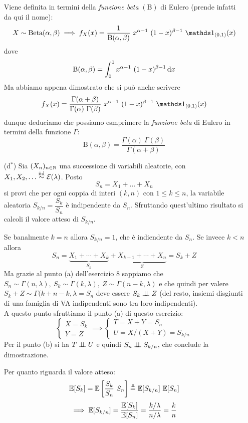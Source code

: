 \begin{enumerate}
\begin{oss}
Viene definita in termini della \emph{funzione beta} $(\mathrm{B})$ di Eulero (prende infatti da qui il nome):
\[
X\sim\text{Beta}(\alpha,\beta)\implies f_X(x)=\frac{1}{\mathrm{B}(\alpha,\beta)}\ x^{\alpha-1}\ (1-x)^{\beta-1}\ \Ind_{(0,1)}(x)
\]
dove
\[
\mathrm{B}(\alpha,\beta)=\int_0^1 x^{\alpha-1}\ (1-x)^{\beta-1}\dx
\]
Ma abbiamo appena dimostrato che si può anche scrivere
\[
f_X(x)=\frac{\Gamma(\alpha+\beta)}{\Gamma(\alpha)\ \Gamma(\beta)}\ x^{\alpha-1}\ (1-x)^{\beta-1}\ \Ind_{(0,1)}(x)
\]
dunque deduciamo che possiamo esmprimere la \emph{funzione beta} di Eulero in termini della funzione $\Gamma$:
\[
\mathrm{B}(\alpha,\beta)=\frac{\Gamma(\alpha)\ \Gamma(\beta)}{\Gamma(\alpha+\beta)}
\]
\end{oss}

\item [(d$^\ast$)] Sia $(X_n)_{n\in\mathbb{N}}$ una successione di variabili aleatorie, con $X_1,X_2,\dots\stackrel{\mathrm{iid}}{\sim}\mathcal{E}(\lambda)$. Posto
\[
S_n=X_1+\dots+X_n
\]
si provi che per ogni coppia di interi $(k,n)$ con $1\leq k\leq n$, la variabile aleatoria $S_{k/n}=\dfrac{S_k}{S_n}$ è indipendente da $S_n$. Sfruttando quest'ultimo risultato si calcoli il valore atteso di $S_{k/n}$.

Se banalmente $k=n$ allora $S_{k/n}=1$, che è indiendente da $S_{n}$. Se invece $k<n$ allora 
\[
S_n=\underbrace{X_1+\cdots+X_k}_{S_k}+\underbrace{X_{k+1}+\cdots+X_n}_{Z}=S_k+Z
\]
Ma grazie al punto (a) dell'esercizio 8 sappiamo che $S_n\sim\Gamma(n,\lambda),\ S_k\sim\Gamma(k,\lambda),\ Z\sim\Gamma(n-k,\lambda)$ e che quindi per valere $S_k+Z\sim\Gamma(k+n-k,\lambda=S_n$ deve essere $S_k\perp \!\!\! \perp Z$ (del resto, insiemi disgiunti di una famiglia di VA indipendenti sono tra loro indipendenti). \\
A questo punto sfruttiamo il punto (a) di questo esercizio:
\[
\begin{cases}
X=S_k \\
Y=Z
\end{cases}
\implies
\begin{cases}
T=X+Y=S_n \\
U=X/(X+Y)=S_{k/n}
\end{cases}
\]
Per il punto (b) si ha $T\perp \!\!\! \perp U$ e quindi $S_n\perp \!\!\! \perp S_{k/n}$, che conclude la dimostrazione.

Per quanto riguarda il valore atteso:
\[
\EE[S_k]=\EE\left[\frac{S_k}{S_n}\ S_n   \right]\overset{\underset{\indep}{}}{=}\EE[S_{k/n}]\ \EE[S_n]
\]
\[
\implies \mathbb{E}[S_{k/n}]=\frac{\mathbb{E}[S_k]}{\mathbb{E}[S_n]}=\frac{k/\lambda}{n/\lambda}=\frac{k}{n}
\]
\end{enumerate}

